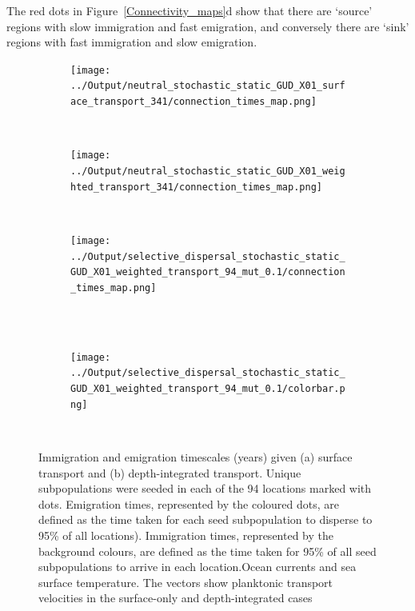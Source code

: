\documentclass[12pt]{article}
\begin{document}
The red dots in Figure~\ref{Connectivity_maps}d show that there are `source' regions with slow immigration and fast emigration, and conversely there are `sink' regions with fast immigration and slow emigration.

\begin{figure}[htp]
        \centering
\begin{subfigure}{.66\textwidth}
        \centering
        \texttt{[image: ../Output/neutral\_stochastic\_static\_GUD\_X01\_surface\_transport\_341/connection\_times\_map.png]}
    \end{subfigure}%
\\
\begin{subfigure}{.66\textwidth}
        \centering
         \texttt{[image: ../Output/neutral\_stochastic\_static\_GUD\_X01\_weighted\_transport\_341/connection\_times\_map.png]}
    \end{subfigure}%
    \\
\begin{subfigure}{.66\textwidth}
        \centering
         \texttt{[image: ../Output/selective\_dispersal\_stochastic\_static\_GUD\_X01\_weighted\_transport\_94\_mut\_0.1/connection\_times\_map.png]}
    \end{subfigure}%
    \\~\\
\begin{subfigure}{.66\textwidth}
        \centering
         \texttt{[image: ../Output/selective\_dispersal\_stochastic\_static\_GUD\_X01\_weighted\_transport\_94\_mut\_0.1/colorbar.png]}
    \end{subfigure}%
    \\
    \caption{Immigration and emigration timescales (years) given (a) surface transport and (b) depth-integrated transport. Unique subpopulations were seeded in each of the 94 locations marked with dots. Emigration times, represented by the coloured dots, are defined as the time taken for each seed subpopulation to disperse to 95\% of all locations). Immigration times, represented by the background colours, are defined as the time taken for 95\% of all seed subpopulations to arrive in each location.Ocean currents and sea surface temperature. The vectors show planktonic transport velocities in the surface-only and depth-integrated cases}
\label{Imm_vs_em}
\end{figure}
\end{document}

